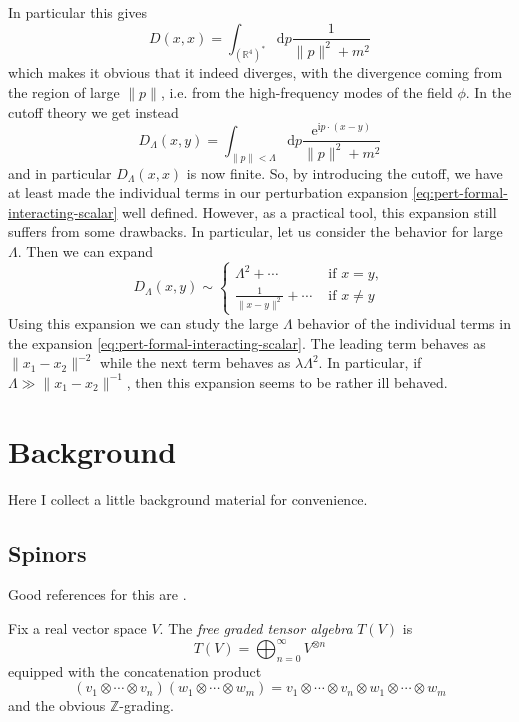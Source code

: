 \documentclass[12pt,letterpaper,reqno]{article}
\numberwithin{equation}{section}
\newcommand{\R}{\ensuremath{\mathbb R}}
\newcommand{\Z}{\ensuremath{\mathbb Z}}
\newcommand{\I}{{\mathrm i}}
\newcommand{\e}{{\mathrm e}}
\newcommand{\de}{\mathrm{d}}
\newcommand{\norm}[1]{\lVert#1\rVert}
\newcommand{\ti}[1]{\textit{#1}}
\newcommand{\fixme}[1]{{\color{orange}{[#1]}}}
\begin{document}
In particular this gives
\begin{equation}
  D(x,x) = \int_{(\R^4)^*} \de p \frac{1}{\norm{p}^2 + m^2}
\end{equation}
which makes it obvious that it 
indeed diverges, with the divergence coming from the region of 
large $\norm{p}$, i.e. from the high-frequency modes of the field $\phi$. 
In the cutoff theory we get instead
\begin{equation}
  D_\Lambda(x,y) = \int_{\norm{p} < \Lambda} \de p \frac{\e^{\I p \cdot (x-y)}}{\norm{p}^2 + m^2}
\end{equation}
and in particular $D_\Lambda(x,x)$ is now finite.
So, by introducing the cutoff, we have at least made the
individual terms in our perturbation 
expansion \eqref{eq:pert-formal-interacting-scalar}
well defined. However, as a practical tool, this
expansion still suffers from some drawbacks. In particular,
let us consider the behavior for large 
$\Lambda$. Then we can expand \fixme{fix the constants}
\begin{equation}
  D_\Lambda(x,y) \sim \begin{cases} \Lambda^2 + \cdots & \text{ if } x = y, \\
  \frac{1}{\norm{x - y}^2} + \cdots & \text{ if } x \neq y \end{cases}
\end{equation}
Using this expansion we can study the large $\Lambda$ behavior of the
individual terms in the expansion \eqref{eq:pert-formal-interacting-scalar}.
The leading term behaves as
$\norm{x_1-x_2}^{-2}$ while the next term behaves as
$\lambda \Lambda^2$.
In particular, if $\Lambda \gg \norm{x_1-x_2}^{-1}$, then
this expansion seems to be rather ill behaved.
\fixme{...}

\appendix

\section{Background}

Here I collect a little background material for convenience.

\subsection{Spinors} \label{app:spinors}

Good references for this are \cite{MR1031992,MR1367507}.

\begin{defn} Fix a real vector space $V$. The
\ti{free graded tensor algebra} $T(V)$ is
\begin{equation}
  T(V) = \bigoplus_{n=0}^\infty V^{\otimes n}
\end{equation}
equipped with the concatenation product
\begin{equation}
  (v_1 \otimes \cdots \otimes v_n) (w_1 \otimes \cdots \otimes w_m) = v_1 \otimes \cdots \otimes v_n \otimes w_1 \otimes \cdots \otimes w_m
\end{equation}
and the obvious $\Z$-grading.
\end{defn}
\end{document}

